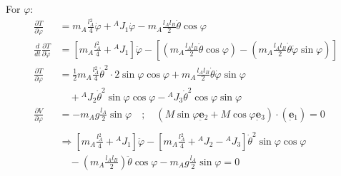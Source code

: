 \documentclass[12pt]{article}
\newcommand{\vb}[1]{{\underset{\tilde{}}{\mathbf{#1}}}}
\begin{document}
\noindent For $\varphi$: 
\begin{align*}
    \frac{\partial T}{\partial \dot{\varphi}} &= m{}_A \frac{l{}_A^2}{4} \dot{\varphi} + {}^A J{}_1 \dot{\varphi} - m{}_A \frac{l{}_A l{}_B}{2} \dot{\theta} \cos\varphi\\
    \frac{d}{dt}\frac{\partial T}{\partial \dot{\varphi}} &= \left[ m{}_A \frac{l{}_A^2}{4} + {}^A J{}_1 \right] \ddot{\varphi} - \left[ \left( m{}_A \frac{l{}_A l{}_B}{2} \ddot{\theta} \cos\varphi \right) - \left( m{}_A \frac{l{}_A l{}_B}{2} \dot{\theta}\dot{\varphi} \sin\varphi \right) \right] \\
    \frac{\partial T}{\partial \varphi} &= \frac{1}{2} m{}_A \frac{l{}_A^2}{4} \dot{\theta}^2 \cdot 2\sin\varphi\cos\varphi + m{}_A \frac{l{}_A l{}_B}{2} \dot{\theta}\dot{\varphi}\sin\varphi \\
    &\quad + {}^A J{}_2 \dot{\theta}^2 \sin\varphi\cos\varphi - {}^A J{}_3 \dot{\theta}^2 \cos\varphi\sin\varphi \\
    \frac{\partial V}{\partial \varphi} &= -m{}_A g \frac{l{}_A}{2} \sin\varphi \quad; \quad(M\sin\varphi \vb{e}{}_2 + M\cos\varphi \vb{e}{}_3) \cdot (\vb{e}{}_1) = 0\\
    \\
    &\Rightarrow \left[ m{}_A \frac{l{}_A^2}{4} + {}^A J{}_1 \right] \ddot{\varphi} - \left[ m{}_A \frac{l{}_A^2}{4} + {}^A J{}_2 - {}^A J{}_3 \right] \dot{\theta}^2\sin\varphi\cos\varphi \\ &\quad - \left( m{}_A \frac{l{}_A l{}_B}{2} \right) \ddot{\theta} \cos\varphi - m{}_A g \frac{l{}_A}{2} \sin\varphi = 0
\end{align*}
\end{document}
